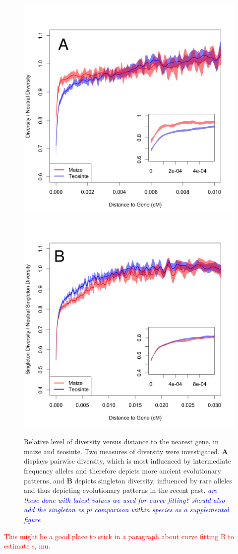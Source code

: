\documentclass{pnastwo}
\newcommand{\jri}[1]{\textcolor{blue}{\emph{#1}} }
\begin{document}
\begin{article}
\begin{figure}[b]
\centering
\includegraphics[width=.45\textwidth]{FigsAndFiles/distanceToGene_WithSignificance_Folded2_manuscript.png} \includegraphics[width=.45\textwidth]{FigsAndFiles/distanceToGene_WithSignificance_Singletons_Downsampled_manuscript.png}
\caption{Relative level of diversity versus distance to the nearest
  gene, in maize and teosinte. Two measures of diversity were
  investigated. \textbf{A} displays pairwise
  diversity, which is most influenced by intermediate frequency
  alleles and therefore depicts more ancient evolutionary patterns,
  and \textbf{B} depicts singleton diversity, influenced by rare
  alleles and thus depicting evolutionary patterns in the recent past. \jri{are these done with latest values we used for curve fitting? should also add the singleton vs pi comparison within species as a supplemental figure}}
\label{purify}
\end{figure}


\textcolor{red}{This might be a good place to stick in a paragraph
  about curve fitting B to estimate s, mu.}



\end{article}
\end{document}

